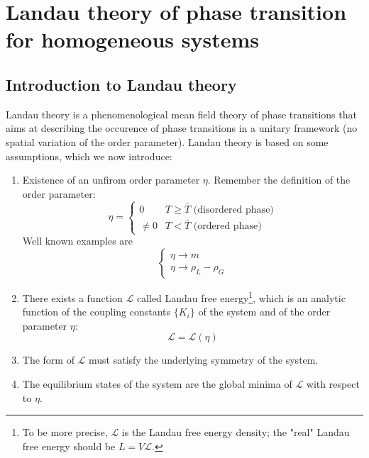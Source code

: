 \documentclass[../main/main.tex]{subfiles}
\begin{document}
\chapter{Landau theory of phase transition for homogeneous systems}

\section{Introduction to Landau theory}

Landau theory is a phenomenological mean field theory of phase transitions  that aims at describing the occurence of phase transitions in a unitary framework (no spatial variation of the order parameter). Landau theory is based on some assumptions, which we now introduce:
\begin{enumerate}
\item Existence of an unfirom order parameter \( \eta   \). Remember the definition of the order parameter:
\begin{equation*}
  \eta   = \begin{cases}
    0 & T \ge \bar{T} \text{ (disordered phase)}\\
    \neq 0 & T < \bar{T}  \text{ (ordered phase)}
\end{cases}
\end{equation*}
Well known examples are
\begin{equation*}
  \begin{cases}
   \eta \rightarrow m \\
  \eta  \rightarrow \rho _L - \rho _G
  \end{cases}
\end{equation*}

\item There exists a function \( \mathcal{L} \)  called Landau free energy\footnote{To be more precise,  \( \mathcal{L} \) is the Landau free energy density; the "real" Landau free energy should be  \( L = V \mathcal{L}  \).}, which is an analytic function of the coupling constants \( \{ K_i\} \) of the system and of the order parameter \( \eta  \):
\begin{equation*}
  \mathcal{L} = \mathcal{L} (\eta )
\end{equation*}

\item The form of \( \mathcal{L} \) must satisfy the underlying symmetry of the system.
\item The equilibrium states of the system are the global minima of \( \mathcal{L} \) with respect to  \( \eta  \).

\end{enumerate}
\end{document}
